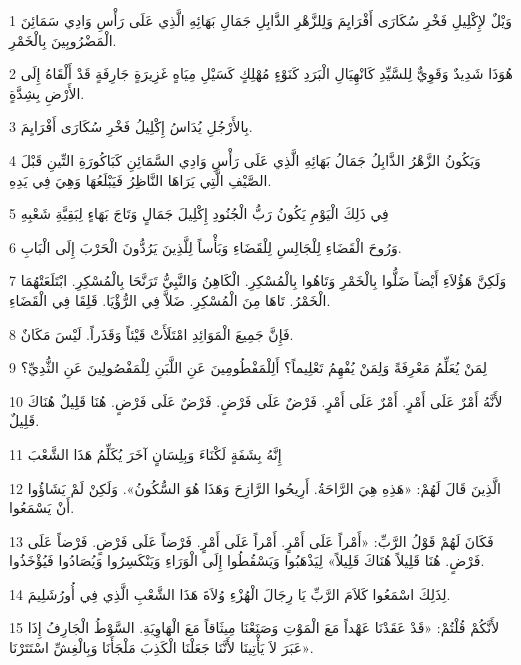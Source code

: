 \par 1 وَيْلٌ لإِكْلِيلِ فَخْرِ سُكَارَى أَفْرَايِمَ وَلِلزَّهْرِ الذَّابِلِ جَمَالِ بَهَائِهِ الَّذِي عَلَى رَأْسِ وَادِي سَمَائِنَ الْمَضْرُوبِينَ بِالْخَمْرِ.
\par 2 هُوَذَا شَدِيدٌ وَقَوِيٌّ لِلسَّيِّدِ كَانْهِيَالِ الْبَرَدِ كَنَوْءٍ مُهْلِكٍ كَسَيْلِ مِيَاهٍ غَزِيرَةٍ جَارِفَةٍ قَدْ أَلْقَاهُ إِلَى الأَرْضِ بِشِدَّةٍ.
\par 3 بِالأَرْجُلِ يُدَاسُ إِكْلِيلُ فَخْرِ سُكَارَى أَفْرَايِمَ.
\par 4 وَيَكُونُ الزَّهْرُ الذَّابِلُ جَمَالُ بَهَائِهِ الَّذِي عَلَى رَأْسِ وَادِي السَّمَائِنِ كَبَاكُورَةِ التِّينِ قَبْلَ الصَّيْفِ الَّتِي يَرَاهَا النَّاظِرُ فَيَبْلَعُهَا وَهِيَ فِي يَدِهِ.
\par 5 فِي ذَلِكَ الْيَوْمِ يَكُونُ رَبُّ الْجُنُودِ إِكْلِيلَ جَمَالٍ وَتَاجَ بَهَاءٍ لِبَقِيَّةِ شَعْبِهِ
\par 6 وَرُوحَ الْقَضَاءِ لِلْجَالِسِ لِلْقَضَاءِ وَبَأْساً لِلَّذِينَ يَرُدُّونَ الْحَرْبَ إِلَى الْبَابِ.
\par 7 وَلَكِنَّ هَؤُلاَءِ أَيْضاً ضَلُّوا بِالْخَمْرِ وَتَاهُوا بِالْمُسْكِرِ. الْكَاهِنُ وَالنَّبِيُّ تَرَنَّحَا بِالْمُسْكِرِ. ابْتَلَعَتْهُمَا الْخَمْرُ. تَاهَا مِنَ الْمُسْكِرِ. ضَلاَّ فِي الرُّؤْيَا. قَلِقَا فِي الْقَضَاءِ.
\par 8 فَإِنَّ جَمِيعَ الْمَوَائِدِ امْتَلَأَتْ قَيْئاً وَقَذَراً. لَيْسَ مَكَانٌ.
\par 9 لِمَنْ يُعَلِّمُ مَعْرِفَةً وَلِمَنْ يُفْهِمُ تَعْلِيماً؟ أَلِلْمَفْطُومِينَ عَنِ اللَّبَنِ لِلْمَفْصُولِينَ عَنِ الثُّدِيِّ؟
\par 10 لأَنَّهُ أَمْرٌ عَلَى أَمْرٍ. أَمْرٌ عَلَى أَمْرٍ. فَرْضٌ عَلَى فَرْضٍ. فَرْضٌ عَلَى فَرْضٍ. هُنَا قَلِيلٌ هُنَاكَ قَلِيلٌ.
\par 11 إِنَّهُ بِشَفَةٍ لَكْنَاءَ وَبِلِسَانٍ آخَرَ يُكَلِّمُ هَذَا الشَّعْبَ
\par 12 الَّذِينَ قَالَ لَهُمْ: «هَذِهِ هِيَ الرَّاحَةُ. أَرِيحُوا الرَّازِحَ وَهَذَا هُوَ السُّكُونُ». وَلَكِنْ لَمْ يَشَاؤُوا أَنْ يَسْمَعُوا.
\par 13 فَكَانَ لَهُمْ قَوْلُ الرَّبِّ: «أَمْراً عَلَى أَمْرٍ. أَمْراً عَلَى أَمْرٍ. فَرْضاً عَلَى فَرْضٍ. فَرْضاً عَلَى فَرْضٍ. هُنَا قَلِيلاً هُنَاكَ قَلِيلاً» لِيَذْهَبُوا وَيَسْقُطُوا إِلَى الْوَرَاءِ وَيَنْكَسِرُوا وَيُصَادُوا فَيُؤْخَذُوا.
\par 14 لِذَلِكَ اسْمَعُوا كَلاَمَ الرَّبِّ يَا رِجَالَ الْهُزْءِ وُلاَةَ هَذَا الشَّعْبِ الَّذِي فِي أُورُشَلِيمَ.
\par 15 لأَنَّكُمْ قُلْتُمْ: «قَدْ عَقَدْنَا عَهْداً مَعَ الْمَوْتِ وَصَنَعْنَا مِيثَاقاً مَعَ الْهَاوِيَةِ. السَّوْطُ الْجَارِفُ إِذَا عَبَرَ لاَ يَأْتِينَا لأَنَّنَا جَعَلْنَا الْكَذِبَ مَلْجَأَنَا وَبِالْغِشِّ اسْتَتَرْنَا».
